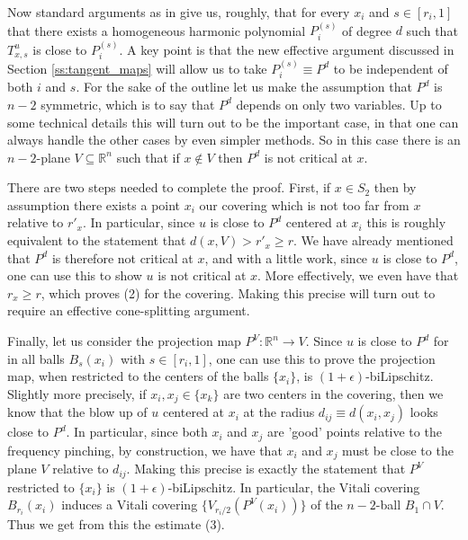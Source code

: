 \documentclass[11pt]{article}
\begin{document}
Now standard arguments as in \cite{chnava} give us, roughly, that for every $x_i$ and $s\in [r_i,1]$ that there exists a homogeneous harmonic polynomial $P_i^{(s)}$ of degree $d$ such that $T_{x,s}^u$ is close to $P_i^{(s)}$.  A key point is that the new effective argument discussed in Section \ref{ss:tangent_maps} will allow us to take $P_i^{(s)}\equiv P^d$ to be independent of both $i$ and $s$.  For the sake of the outline let us make the assumption that $P^d$ is $n-2$ symmetric, which is to say that $P^d$ depends on only two variables.  Up to some technical details this will turn out to be the important case, in that one can always handle the other cases by even simpler methods.  So in this case there is an $n-2$-plane $V\subseteq {\mathds{R}}^n$ such that if $x\not\in V$ then $P^d$ is not critical at $x$.  

There are two steps needed to complete the proof.  First, if $x\in S_2$ then by assumption there exists a point $x_i$ our covering which is not too far from $x$ relative to $r'_{x}$.  In particular, since $u$ is close to $P^d$ centered at $x_i$ this is roughly equivalent to the statement that $d(x,V)>r'_x\geq r$.  We have already mentioned that $P^d$ is therefore not critical at $x$, and with a little work, since $u$ is close to $P^d$, one can use this to show $u$ is not critical at $x$.  More effectively, we even have that $r_x\geq r$, which proves (2) for the covering.  Making this precise will turn out to require an effective cone-splitting argument.

Finally, let us consider the projection map $P^V:{\mathds{R}}^n\to V$.  Since $u$ is close to $P^d$ for in all balls $B_{s}(x_i)$ with $s\in [r_i,1]$, one can use this to prove the projection map, when restricted to the centers of the balls $\{x_i\}$, is $(1+\epsilon)$-biLipschitz.  Slightly more precisely, if $x_i,x_j\in \{x_k\}$ are two centers in the covering, then we know that the blow up of $u$ centered at $x_i$ at the radius $d_{ij}\equiv d(x_i,x_j)$ looks close to $P^d$.  In particular, since both $x_i$ and $x_j$ are 'good' points relative to the frequency pinching, by construction, we have that $x_i$ and $x_j$ must be close to the plane $V$ relative to $d_{ij}$.  Making this precise is exactly the statement that $P^V$ restricted to $\{x_i\}$ is $(1+\epsilon)$-biLipschitz.  In particular, the Vitali covering $B_{r_i}(x_i)$ induces a Vitali covering $\{V_{r_i/2}(P^V(x_i))\}$ of the $n-2$-ball $B_1\cap V$.  Thus we get from this the estimate (3).

\clearpage
\end{document}
